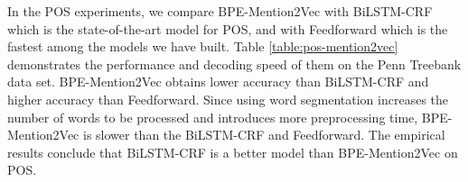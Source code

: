 In the POS experiments, we compare BPE-Mention2Vec with BiLSTM-CRF which is the state-of-the-art model for POS, and with Feedforward which is the fastest among the models we have built. Table \ref{table:pos-mention2vec} demonstrates the performance and decoding speed of them on the Penn Treebank data set. BPE-Mention2Vec obtains lower accuracy than BiLSTM-CRF and higher accuracy than Feedforward. Since using word segmentation increases the number of words to be processed and introduces more preprocessing time, BPE-Mention2Vec is slower than the BiLSTM-CRF and Feedforward. The empirical results conclude that BiLSTM-CRF is a better model than BPE-Mention2Vec on POS. 

